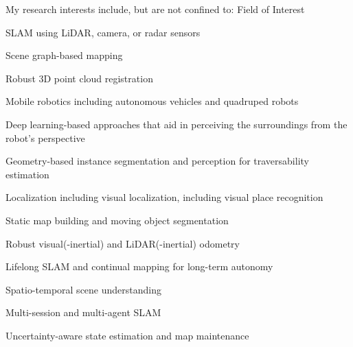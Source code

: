 \cventry
  {My research interests include, but are not confined to:} %
  {Field of Interest}%
  {} %
  {} %
  {
    \begin{cvitems} %
      \item {SLAM using LiDAR, camera, or radar sensors\lineintv}
      \item {Scene graph-based mapping\lineintv}
      \item {Robust 3D point cloud registration\lineintv}
      \item {Mobile robotics including autonomous vehicles and quadruped robots\lineintv}
      \item {Deep learning-based approaches that aid in perceiving the surroundings from the robot's perspective\lineintv}
      \item {Geometry-based instance segmentation and perception for traversability estimation\lineintv}
      \item {Localization including visual localization, including visual place recognition\lineintv}
      \item {Static map building and moving object segmentation\lineintv}
      \item {Robust visual(-inertial) and LiDAR(-inertial) odometry\lineintv}
      \item {Lifelong SLAM and continual mapping for long-term autonomy\lineintv}
      \item {Spatio-temporal scene understanding\lineintv}
      \item {Multi-session and multi-agent SLAM\lineintv}
      \item {Uncertainty-aware state estimation and map maintenance\lineintv}
    \end{cvitems}
  }

